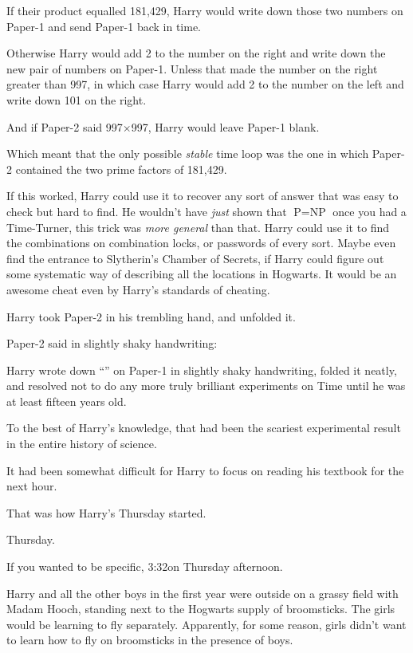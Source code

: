 If their product equalled 181,429, Harry would write down those two numbers on Paper-1 and send Paper-1 back in time.

Otherwise Harry would add 2 to the number on the right and write down the new pair of numbers on Paper-1. Unless that made the number on the right greater than 997, in which case Harry would add 2 to the number on the left and write down 101 on the right.

And if Paper-2 said 997$\times$997, Harry would leave Paper-1 blank.

Which meant that the only possible \emph{stable} time loop was the one in which Paper-2 contained the two prime factors of 181,429.

If this worked, Harry could use it to recover any sort of answer that was easy to check but hard to find. He wouldn’t have \emph{just} shown that $\mbox{P}=\mbox{NP}$ once you had a Time-Turner, this trick was \emph{more general} than that. Harry could use it to find the combinations on combination locks, or passwords of every sort. Maybe even find the entrance to Slytherin’s Chamber of Secrets, if Harry could figure out some systematic way of describing all the locations in Hogwarts. It would be an awesome cheat even by Harry’s standards of cheating.

Harry took Paper-2 in his trembling hand, and unfolded it.

Paper-2 said in slightly shaky handwriting:


Harry wrote down “” on Paper-1 in slightly shaky handwriting, folded it neatly, and resolved not to do any more truly brilliant experiments on Time until he was at least fifteen years old.

To the best of Harry’s knowledge, that had been the scariest experimental result in the entire history of science.

It had been somewhat difficult for Harry to focus on reading his textbook for the next hour.

That was how Harry’s Thursday started.

\later

Thursday.

If you wanted to be specific, 3:32\pm on Thursday afternoon.

Harry and all the other boys in the first year were outside on a grassy field with Madam Hooch, standing next to the Hogwarts supply of broomsticks. The girls would be learning to fly separately. Apparently, for some reason, girls didn’t want to learn how to fly on broomsticks in the presence of boys.

